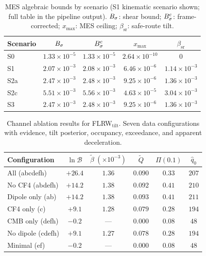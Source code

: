 \begin{table}[t]
\centering
\caption{MES algebraic bounds by scenario (S1 kinematic scenario
  shown; full table in the pipeline output).  $B_\sigma$: shear
  bound; $B_\sigma^c$: frame-corrected; $x_{\max}$: MES
  ceiling; $\beta_{\mathrm{sr}}$: safe-route tilt.}
\label{tab:bounds}
\footnotesize
\begin{tabular}{lcccc}
\toprule
Scenario & $B_\sigma$ & $B_\sigma^c$ & $x_{\max}$ & $\beta_{\mathrm{sr}}$ \\
\midrule
S0  & $1.33 \times 10^{-5}$ & $1.33 \times 10^{-5}$ & $2.64 \times 10^{-10}$ & $0$ \\
S1  & $2.07 \times 10^{-3}$ & $2.08 \times 10^{-3}$ & $6.46 \times 10^{-6}$  & $1.14 \times 10^{-3}$ \\
S2a & $2.47 \times 10^{-3}$ & $2.48 \times 10^{-3}$ & $9.25 \times 10^{-6}$  & $1.36 \times 10^{-3}$ \\
S2c & $5.51 \times 10^{-3}$ & $5.56 \times 10^{-3}$ & $4.63 \times 10^{-5}$  & $3.04 \times 10^{-3}$ \\
S3  & $2.47 \times 10^{-3}$ & $2.48 \times 10^{-3}$ & $9.25 \times 10^{-6}$  & $1.36 \times 10^{-3}$ \\
\bottomrule
\end{tabular}
\end{table}

\begin{table}[t]
\centering
\caption{Channel ablation results for FLRW$_{\mathrm{tilt}}$.
  Seven data configurations with evidence, tilt posterior,
  occupancy, exceedance, and apparent deceleration.}
\label{tab:ablation}
\footnotesize
\begin{tabular}{lccccc}
\toprule
Configuration & $\ln\mathcal{B}$ & $\tilde{\beta}\;(\times 10^{-3})$
  & $\tilde{Q}$ & $\Pi(0.1)$ & $\hat{q}_0$ \\
\midrule
All (abcdefh)    & $+26.4$ & $1.36$ & $0.090$ & $0.33$ & $207$ \\
No CF4 (abdefh)  & $+14.2$ & $1.38$ & $0.092$ & $0.41$ & $210$ \\
Dipole only (ab) & $+14.2$ & $1.38$ & $0.093$ & $0.41$ & $211$ \\
CF4 only (c)     & $+9.1$  & $1.28$ & $0.079$ & $0.28$ & $194$ \\
CMB only (defh)  & $-0.2$  & ---    & $0.000$ & $0.08$ & $48$  \\
No dipole (cdefh)& $+9.1$  & $1.27$ & $0.078$ & $0.28$ & $194$ \\
Minimal (ef)     & $-0.2$  & ---    & $0.000$ & $0.08$ & $48$  \\
\bottomrule
\end{tabular}
\end{table}


